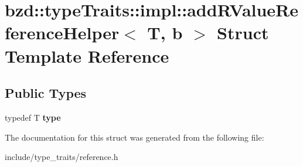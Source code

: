 \hypertarget{structbzd_1_1typeTraits_1_1impl_1_1addRValueReferenceHelper}{}\section{bzd\+:\+:type\+Traits\+:\+:impl\+:\+:add\+R\+Value\+Reference\+Helper$<$ T, b $>$ Struct Template Reference}
\label{structbzd_1_1typeTraits_1_1impl_1_1addRValueReferenceHelper}
\subsection*{Public Types}
\begin{DoxyCompactItemize}
\item 
\mbox{\label{structbzd_1_1typeTraits_1_1impl_1_1addRValueReferenceHelper_ac07604271e196f20cb07f8e105aaa5eb}} 
typedef T {\bfseries type}
\end{DoxyCompactItemize}


The documentation for this struct was generated from the following file\+:\begin{DoxyCompactItemize}
\item 
include/type\+\_\+traits/reference.\+h\end{DoxyCompactItemize}
